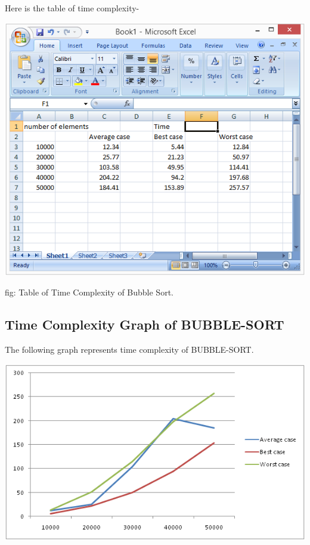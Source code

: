 \documentclass[9 pt]{report}
\begin{document}
Here is the table of time complexity-

\vspace{1cm}

\includegraphics{bubbledata.png}

\hspace{5cm}fig: Table of Time Complexity of Bubble Sort.

\subsection{\huge Time Complexity Graph of BUBBLE-SORT}

The following graph represents time complexity of BUBBLE-SORT.

\vspace{1cm}

\includegraphics{bubble sort.png}
\end{document}
